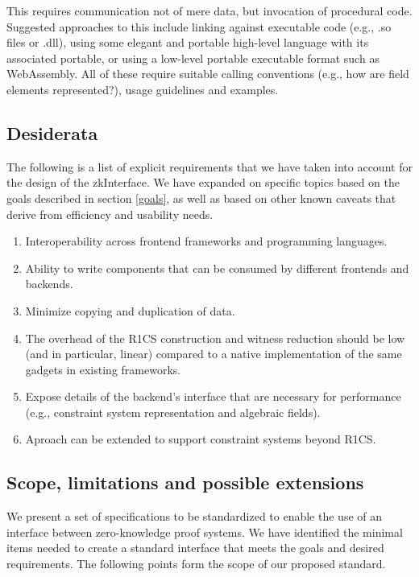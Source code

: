 \documentclass[a4paper,12pt]{article}
\begin{document}
This requires communication not of mere data, but invocation of procedural code. Suggested approaches to this include linking against executable code (e.g., .so files or .dll), using some elegant and portable high-level language with its associated portable, or using a low-level portable executable format such as WebAssembly. All of these require suitable calling conventions (e.g., how are field elements represented?), usage guidelines and examples.


\subsection{Desiderata}
The following is a list of explicit requirements that we have taken into account for the design of the zkInterface. We have expanded on specific topics based on the goals described in section \ref{goals}, as well as based on other known caveats that derive from efficiency and usability needs.

\begin{enumerate}
	\item Interoperability across frontend frameworks and programming languages.
	\item Ability to write components that can be consumed by different frontends and backends.
	\item Minimize copying and duplication of data.
	\item The overhead of the R1CS construction and witness reduction should be low (and in particular, linear) compared to a native implementation of the same gadgets in existing frameworks.
	\item Expose details of the backend's interface that are necessary for performance (e.g., constraint system representation and algebraic fields).
	\item Aproach can be extended to support constraint systems beyond R1CS.
\end{enumerate}

\subsection{Scope, limitations and possible extensions}

We present a set of specifications to be standardized to enable the use of an interface between zero-knowledge proof systems. We have identified the minimal items needed to create a standard interface that meets the goals and desired requirements. The following points form the scope of our proposed standard.
\end{document}
